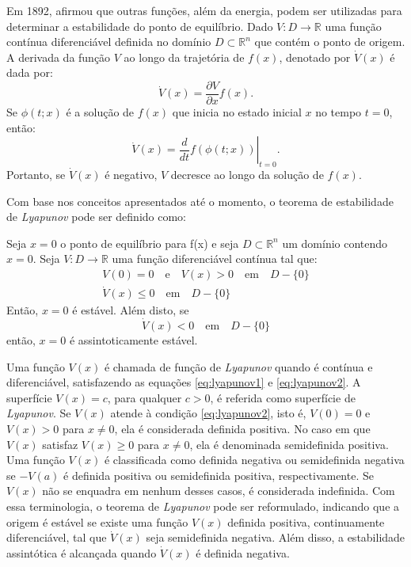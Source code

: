 Em 1892, \cite{lyapunov1892} afirmou que outras funções, além da energia, podem ser utilizadas para determinar a estabilidade do ponto de equilíbrio. Dado $V : D \rightarrow \mathbb{R}$ uma função contínua diferenciável definida no domínio $D \subset \mathbb{R}^n$ que contém o ponto de origem. A derivada da função $V$ ao longo da trajetória de $f(x)$, denotado por $\dot{V}(x)$ é dada por: \begin{equation} \dot{V}(x) = \frac{\partial V}{\partial x}f(x). \end{equation} Se $\phi(t;x)$ é a solução de $f(x)$ que inicia no estado inicial $x$ no tempo $t = 0$, então: \begin{equation} \dot{V}(x) = \left. \frac{d}{dt}f(\phi(t;x))\right|_{t=0}. \end{equation} Portanto, se $\dot{V}(x)$ é negativo, $V$ decresce ao longo da solução de $f(x)$.

Com base nos conceitos apresentados até o momento, o teorema de estabilidade de \textit{Lyapunov }pode ser definido como:

\begin{theorem}
  Seja $x = 0$ o ponto de equilíbrio para f(x) e seja $D \subset \mathbb{R}^n$ um domínio contendo $x = 0$. Seja $V : D \rightarrow \mathbb{R}$ uma função diferenciável contínua tal que: \begin{gather}
    V(0) = 0 \quad \text{e} \quad V(x) > 0 \quad \mathrm{em} \quad D - \{0\} \label{eq:lyapunov1} \\
    \dot{V}(x) \leq 0 \quad \mathrm{em} \quad D - \{0\} \label{eq:lyapunov2}
  \end{gather} Então, $x=0$ é estável. Além disto, se \begin{equation}
    \dot{V}(x) < 0 \quad \mathrm{em} \quad D - \{0\} \label{eq:lyapunov3}
  \end{equation}
  então, $x=0$ é assintoticamente estável.
\end{theorem}

Uma função $V(x)$ é chamada de função de \textit{Lyapunov }quando é contínua e diferenciável, satisfazendo as equações \eqref{eq:lyapunov1} e \eqref{eq:lyapunov2}. A superfície $V(x) = c$, para qualquer $c > 0$, é referida como superfície de \textit{Lyapunov}. Se $V(x)$ atende à condição \eqref{eq:lyapunov2}, isto é, $V(0) = 0$ e $V(x) > 0$ para $x \neq 0$, ela é considerada definida positiva. No caso em que $V(x)$ satisfaz $V(x) \geq 0$ para $x \neq 0$, ela é denominada semidefinida positiva. Uma função $V(x)$ é classificada como definida negativa ou semidefinida negativa se $-V(a)$ é definida positiva ou semidefinida positiva, respectivamente. Se $V(x)$ não se enquadra em nenhum desses casos, é considerada indefinida. Com essa terminologia, o teorema de \textit{Lyapunov }pode ser reformulado, indicando que a origem é estável se existe uma função $V(x)$ definida positiva, continuamente diferenciável, tal que $\dot{V}(x)$ seja semidefinida negativa. Além disso, a estabilidade assintótica é alcançada quando $\dot{V}(x)$ é definida negativa.

